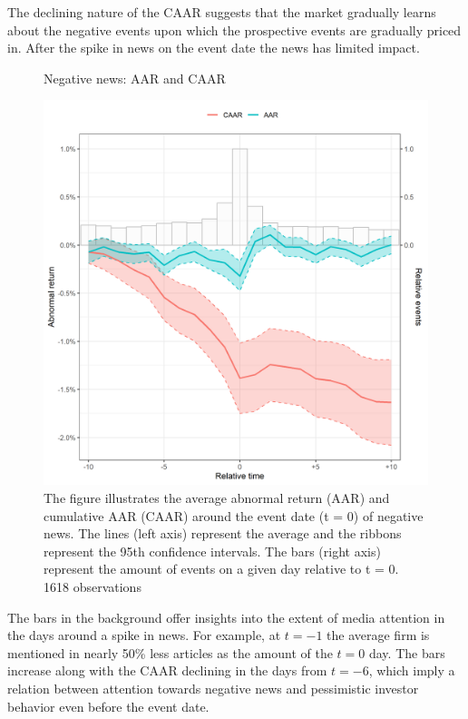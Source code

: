 The declining nature of the CAAR suggests that the market gradually learns about the negative events upon which the prospective events are gradually priced in. After the spike in news on the event date the news has limited impact. \\ 


\begin{figure} [H]
    \centering
    \caption{Negative news: AAR and CAAR}
    \includegraphics[scale=0.6]{Projekt/1.Figures analysis/ST_negative_all_CI.png}
     \caption*{\footnotesize The figure illustrates the average abnormal return (AAR) and cumulative AAR (CAAR) around the event date (t = 0) of negative news. The lines (left axis) represent the average and the ribbons represent the 95th confidence intervals. The bars (right axis) represent the amount of events on a given day relative to t = 0. 1618 observations }
    \label{fig:ST_neg_news}
\end{figure} 

 
The bars in the background offer insights into the extent of media attention in the days around a spike in news. For example, at $t = -1$ the average firm is mentioned in nearly 50\% less articles as the amount of the $t = 0$ day. The bars increase along with the CAAR declining in the days from $t=-6$, which imply a relation between attention towards negative news and pessimistic investor behavior even before the event date. 

